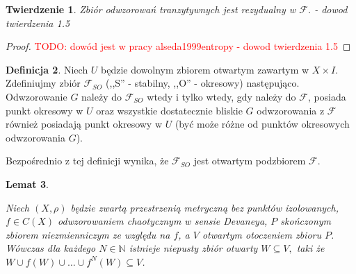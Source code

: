 \documentclass[licencjacka]{pwr_wmat_praca_dyplomowa}
\theoremstyle{plain}
\newtheorem{theorem}{Twierdzenie}
\numberwithin{theorem}{chapter}
\newtheorem{lemma}[theorem]{Lemat}
\theoremstyle{definition}
\numberwithin{theorem}{chapter}
\newtheorem{definition}[theorem]{Definicja}
\begin{document}
\begin{theorem} \label{tranzytywne_rezydualne_w_F}
Zbiór odwzorowań tranzytywnych jest rezydualny w $\mathcal{F}$.
\cite{alseda1999entropy} - dowod twierdzenia 1.5
\end{theorem}

\begin{proof}
\textcolor{red}{TODO: dowód jest w pracy {alseda1999entropy} - dowod twierdzenia 1.5}
\end{proof}



\begin{definition} \label{Fso_sa_otwartymi_podzbiorami_F}
Niech $U$ będzie dowolnym zbiorem otwartym zawartym w $X \times I$. Zdefiniujmy zbiór $\mathcal{F}_{SO}$ (,,S'' - stabilny, ,,O'' - okresowy) następująco. Odwzorowanie $G$ należy do $\mathcal{F}_{SO}$ wtedy i tylko wtedy, gdy należy do $\mathcal{F}$, posiada punkt okresowy w $U$ oraz wszystkie dostatecznie bliskie $G$ odwzorowania z $\mathcal{F}$ również posiadają punkt okresowy w $U$ (być może różne od punktów okresowych odwzorowania $G$).
\end{definition}
Bezpośrednio z tej definicji wynika, że $\mathcal{F}_{SO}$ jest otwartym podzbiorem $\mathcal{F}.$




\begin{lemma}
\label{w_otoczeniu_niezmienniczego_jest_otwarty_zawarty_w_iteracjach}

Niech $(X, \rho)$ będzie zwartą przestrzenią metryczną bez punktów izolowanych, $f \in C(X)$ odwzorowaniem chaotycznym w sensie Devaneya, $P$ skończonym zbiorem niezmienniczym ze względu na $f$, a $V$ otwartym otoczeniem zbioru $P$.
Wówczas dla każdego $N \in \mathbb{N}$ istnieje niepusty zbiór otwarty $W \subseteq V,$ taki że $W \cup f(W) \cup \ldots \cup f^N(W) \subseteq V$.
\end{lemma}
\end{document}
